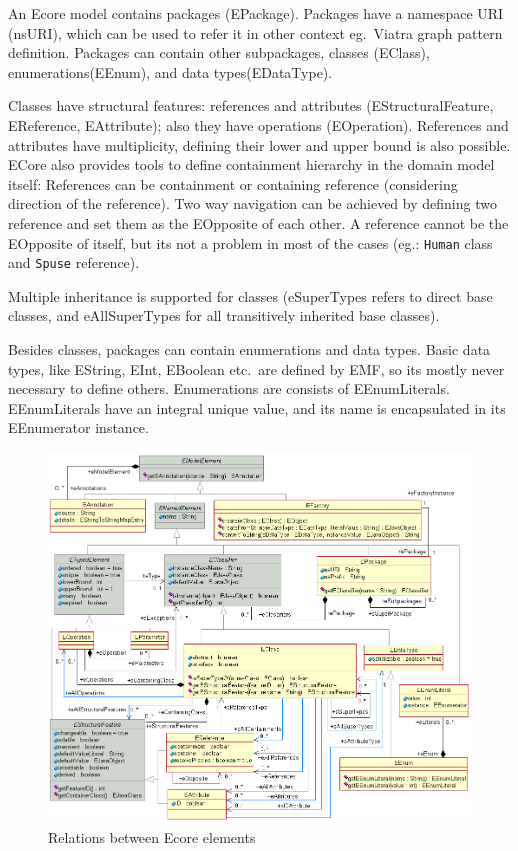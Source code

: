 An Ecore model contains packages (EPackage). 
Packages have a namespace URI (nsURI), which can be used to refer it in other context eg.\ Viatra graph pattern definition.
Packages can contain other subpackages, classes (EClass), enumerations(EEnum), and data types(EDataType).

Classes have structural features: references and attributes (EStructuralFeature, EReference, EAttribute); also they have operations (EOperation).
References and attributes have multiplicity, defining their lower and upper bound is also possible.
ECore also provides tools to define containment hierarchy in the domain model itself: References can be containment or containing reference (considering direction of the reference). 
Two way navigation can be achieved by defining two reference and set them as the EOpposite of each other. A reference cannot be the EOpposite of itself, but its not a problem in most of the cases (eg.: \texttt{Human} class and \texttt{Spuse} reference). 

Multiple inheritance is supported for classes (eSuperTypes refers to direct base classes, and eAllSuperTypes for all transitively inherited base classes).

Besides classes, packages can contain enumerations and data types. 
Basic data types, like EString, EInt, EBoolean etc.\ are defined by EMF, so its mostly never necessary to define others.
Enumerations are consists of EEnumLiterals. 
EEnumLiterals have an integral unique value, and its name is encapsulated in its EEnumerator instance.





\begin{figure}[!ht]
	\begin{center}
		\includegraphics[width=\textwidth]{figures/EcoreRelations.png}
		\caption{Relations between Ecore elements}
		\label{fig:ecore-relations}
	\end{center}
\end{figure}

